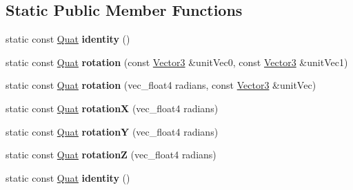 \subsection*{Static Public Member Functions}
\begin{DoxyCompactItemize}
\item 
\hypertarget{classVectormath_1_1Soa_1_1Quat_aa895469375ce2dc477651d8dec23436b}{static const \hyperlink{classVectormath_1_1Soa_1_1Quat}{Quat} {\bfseries identity} ()}\label{classVectormath_1_1Soa_1_1Quat_aa895469375ce2dc477651d8dec23436b}

\item 
\hypertarget{classVectormath_1_1Soa_1_1Quat_a437646929d798ff5cd7db1662c0dd6e0}{static const \hyperlink{classVectormath_1_1Soa_1_1Quat}{Quat} {\bfseries rotation} (const \hyperlink{classVectormath_1_1Soa_1_1Vector3}{Vector3} \&unit\-Vec0, const \hyperlink{classVectormath_1_1Soa_1_1Vector3}{Vector3} \&unit\-Vec1)}\label{classVectormath_1_1Soa_1_1Quat_a437646929d798ff5cd7db1662c0dd6e0}

\item 
\hypertarget{classVectormath_1_1Soa_1_1Quat_a14b70d83c45b5e5171cfa049f52c6824}{static const \hyperlink{classVectormath_1_1Soa_1_1Quat}{Quat} {\bfseries rotation} (vec\-\_\-float4 radians, const \hyperlink{classVectormath_1_1Soa_1_1Vector3}{Vector3} \&unit\-Vec)}\label{classVectormath_1_1Soa_1_1Quat_a14b70d83c45b5e5171cfa049f52c6824}

\item 
\hypertarget{classVectormath_1_1Soa_1_1Quat_a466264f225e2128860167e5fc82f5c77}{static const \hyperlink{classVectormath_1_1Soa_1_1Quat}{Quat} {\bfseries rotation\-X} (vec\-\_\-float4 radians)}\label{classVectormath_1_1Soa_1_1Quat_a466264f225e2128860167e5fc82f5c77}

\item 
\hypertarget{classVectormath_1_1Soa_1_1Quat_a618c6f85c06506106482ae82d413566b}{static const \hyperlink{classVectormath_1_1Soa_1_1Quat}{Quat} {\bfseries rotation\-Y} (vec\-\_\-float4 radians)}\label{classVectormath_1_1Soa_1_1Quat_a618c6f85c06506106482ae82d413566b}

\item 
\hypertarget{classVectormath_1_1Soa_1_1Quat_a1e92a0f63e9ba127b09d15e586f5a1b6}{static const \hyperlink{classVectormath_1_1Soa_1_1Quat}{Quat} {\bfseries rotation\-Z} (vec\-\_\-float4 radians)}\label{classVectormath_1_1Soa_1_1Quat_a1e92a0f63e9ba127b09d15e586f5a1b6}

\item 
\hypertarget{classVectormath_1_1Soa_1_1Quat_a4ff533f3a4b8b6bc686c7c5c26535580}{static const \hyperlink{classVectormath_1_1Soa_1_1Quat}{Quat} {\bfseries identity} ()}\label{classVectormath_1_1Soa_1_1Quat_a4ff533f3a4b8b6bc686c7c5c26535580}


\end{DoxyCompactItemize}
